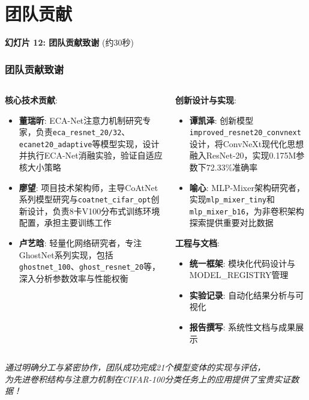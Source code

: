 \documentclass[10pt]{beamer}
\begin{document}
\section{团队贡献}
\scriptsize
\begin{frame}{\textbf{幻灯片 12: 团队贡献致谢} (约30秒)}
\frametitle{团队贡献致谢}

\begin{columns}[T]
    \begin{column}{0.48\textwidth}
        \textbf{核心技术贡献}:
        \begin{itemize}
            \item \textbf{董瑞昕}: ECA-Net注意力机制研究专家，负责\texttt{eca\_resnet\_20/32}、\texttt{ecanet20\_adaptive}等模型实现，设计并执行ECA-Net消融实验，验证自适应核大小策略
            \item \textbf{廖望}: 项目技术架构师，主导CoAtNet系列模型研究与\texttt{coatnet\_cifar\_opt}创新设计，负责8卡V100分布式训练环境配置，承担主要训练工作
            \item \textbf{卢艺晗}: 轻量化网络研究者，专注GhostNet系列实现，包括\texttt{ghostnet\_100}、\texttt{ghost\_resnet\_20}等，深入分析参数效率与性能权衡
        \end{itemize}
    \end{column}
    \begin{column}{0.48\textwidth}
        \textbf{创新设计与实现}:
        \begin{itemize}
            \item \textbf{谭凯泽}: 创新模型\texttt{improved\_resnet20\_convnext}设计，将ConvNeXt现代化思想融入ResNet-20，实现0.175M参数下72.33\%准确率
            \item \textbf{喻心}: MLP-Mixer架构研究者，实现\texttt{mlp\_mixer\_tiny}和\texttt{mlp\_mixer\_b16}，为非卷积架构探索提供重要对比数据
        \end{itemize}
        
        \vspace{0.5em}
        \textbf{工程与文档}:
        \begin{itemize}
            \item \textbf{统一框架}: 模块化代码设计与MODEL\_REGISTRY管理
            \item \textbf{实验记录}: 自动化结果分析与可视化
            \item \textbf{报告撰写}: 系统性文档与成果展示
        \end{itemize}
    \end{column}
\end{columns}

\vspace{0.8em}
\centering
\textit{通过明确分工与紧密协作，团队成功完成21个模型变体的实现与评估，\\
为先进卷积结构与注意力机制在CIFAR-100分类任务上的应用提供了宝贵实证数据！}

\end{frame}
\end{document}
